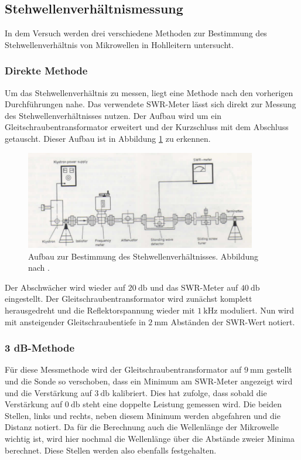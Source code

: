 \subsection{Stehwellenverhältnismessung}
In dem Versuch werden drei verschiedene Methoden zur Bestimmung des Stehwellenverhältnis von Mikrowellen in Hohlleitern untersucht.

\subsubsection{Direkte Methode}
Um das Stehwellenverhältnis zu messen, liegt eine Methode nach den vorherigen Durchführungen nahe. Das verwendete SWR-Meter lässt sich direkt zur Messung des Stehwellenverhältnisses nutzen. Der Aufbau wird um ein Gleitschraubentransformator erweitert
und der Kurzschluss mit dem Abschluss getauscht. Dieser Aufbau ist in Abbildung \ref{fig:3} zu erkennen. 

\begin{figure}
    \centering
    \includegraphics[width=0.9\textwidth]{Bilder/aufbau3.png}
    \caption{Aufbau zur Bestimmung des Stehwellenverhältnisses. Abbildung nach \cite{skript}.} 
    \label{fig:3}
\end{figure}
Der Abschwächer wird wieder auf $\SI{20}{\decibel}$ und das SWR-Meter auf $\SI{40}{\decibel}$ eingestellt. Der Gleitschraubentransformator wird zunächst komplett herausgedreht und die Reflektorspannung wieder mit $\SI{1}{\kilo\hertz}$ moduliert.
Nun wird mit ansteigender Gleitschraubentiefe in $\SI{2}{\milli\meter}$ Abständen der SWR-Wert notiert.

\subsubsection{3 dB-Methode}
Für diese Messmethode wird der Gleitschraubentransformator auf $\SI{9}{\milli\meter}$ gestellt und die Sonde so verschoben, dass ein Minimum am SWR-Meter angezeigt wird und die Verstärkung auf $\SI{3}{\decibel}$ kalibriert.  Dies hat zufolge, dass 
sobald die Verstärkung auf $\SI{0}{\decibel}$ steht eine doppelte Leistung gemessen wird. Die beiden Stellen, links und rechts, neben diesem Minimum werden abgefahren und die Distanz notiert. Da für die Berechnung auch die
Wellenlänge der Mikrowelle wichtig ist, wird hier nochmal die Wellenlänge über die Abstände zweier Minima berechnet. Diese Stellen werden also ebenfalls festgehalten.

